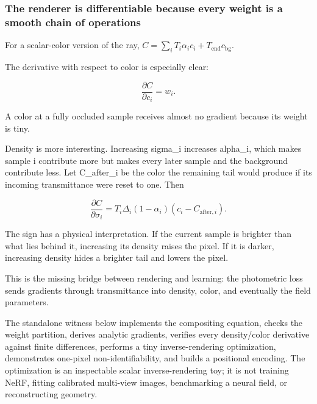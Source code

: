 \subsubsection{The renderer is differentiable because every weight is a smooth chain of operations}\label{the-renderer-is-differentiable-because-every-weight-is-a-smooth-chain-of-operations}

For a scalar-color version of the ray, \(C=\sum_iT_i\alpha_ic_i+T_{\mathrm{end}}c_{\mathrm{bg}}\).

The derivative with respect to color is especially clear:

\[\frac{\partial C}{\partial c_i}=w_i.\]

A color at a fully occluded sample receives almost no gradient because its weight is tiny.

Density is more interesting. Increasing sigma\_i increases alpha\_i, which makes sample i contribute more but makes every later sample and the background contribute less. Let C\_after\_i be the color the remaining tail would produce if its incoming transmittance were reset to one. Then

\[\frac{\partial C}{\partial\sigma_i}=T_i\Delta_i(1-\alpha_i)(c_i-C_{\mathrm{after},i}).\]

The sign has a physical interpretation. If the current sample is brighter than what lies behind it, increasing its density raises the pixel. If it is darker, increasing density hides a brighter tail and lowers the pixel.

This is the missing bridge between rendering and learning: the photometric loss sends gradients through transmittance into density, color, and eventually the field parameters.

The standalone witness below implements the compositing equation, checks the weight partition, derives analytic gradients, verifies every density/color derivative against finite differences, performs a tiny inverse-rendering optimization, demonstrates one-pixel non-identifiability, and builds a positional encoding. The optimization is an inspectable scalar inverse-rendering toy; it is not training NeRF, fitting calibrated multi-view images, benchmarking a neural field, or reconstructing geometry.

